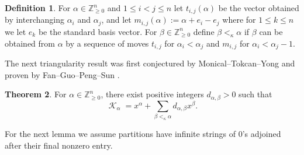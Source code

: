 \documentclass[12pt,reqno]{amsart}
\theoremstyle{definition}
\newtheorem{thm}{Theorem}[section]
\newtheorem{defn}[thm]{Definition}
\DeclareMathOperator{\cK}{\mathcal{K}}
\begin{document}
\begin{defn}\cite{MTY19}\label{key moves defn}
    For $\alpha \in \mathbb{Z}_{\geq 0}^n$ and $1 \leq i < j \leq n$ let $t_{i,j}(\alpha)$ be the vector obtained by interchanging $\alpha_i$ and $\alpha_j$, and let $m_{i,j}(\alpha) := \alpha + e_i-e_j$ where for $1\leq k \leq n$ we let $e_k$ be the standard basis vector. For $\beta \in \mathbb{Z}_{\geq 0}^{n}$ define $\beta <_{\kappa} \alpha $ if $\beta$ can be obtained from $\alpha$ by a sequence of moves $t_{i,j}$ for $\alpha_i < \alpha_j$ and $m_{i,j}$ for $\alpha_i < \alpha_j -1.$ 
\end{defn}

The next triangularity result was first conjectured by Monical--Tokcan--Yong \cite{MTY19} and proven by Fan--Guo--Peng--Sun \cite{FGPS}. 

\begin{thm}\cite{FGPS}\label{monomials in key polys thm}
    For $\alpha \in \mathbb{Z}_{\geq 0}^{n}$, there exist positive integers $d_{\alpha,\beta} > 0$ such that
    $$\cK_{\alpha} = x^{\alpha} + \sum_{\beta <_{\kappa} \alpha} d_{\alpha, \beta} x^{\beta}.$$ 
\end{thm}

For the next lemma we assume partitions have infinite strings of $0$'s adjoined after their final nonzero entry.   
\end{document}
